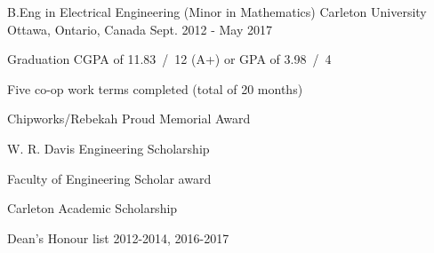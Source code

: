 

\begin{cventries}

  \cventry
    {B.Eng in Electrical Engineering (Minor in Mathematics)} %
    {Carleton University} %
    {Ottawa, Ontario, Canada} %
    {Sept. 2012 - May 2017} %
    {
      \begin{cvitems} %
        \item {Graduation CGPA of 11.83~/~12 (A+) or GPA of 3.98~/~4}
        \item {Five co-op work terms completed (total of 20 months)}
        \item {Chipworks/Rebekah Proud Memorial Award}
        \item {W. R. Davis Engineering Scholarship}
        \item {Faculty of Engineering Scholar award}
        \item {Carleton Academic Scholarship}
        \item {Dean's Honour list 2012-2014, 2016-2017}
      \end{cvitems}
    }

\end{cventries}
